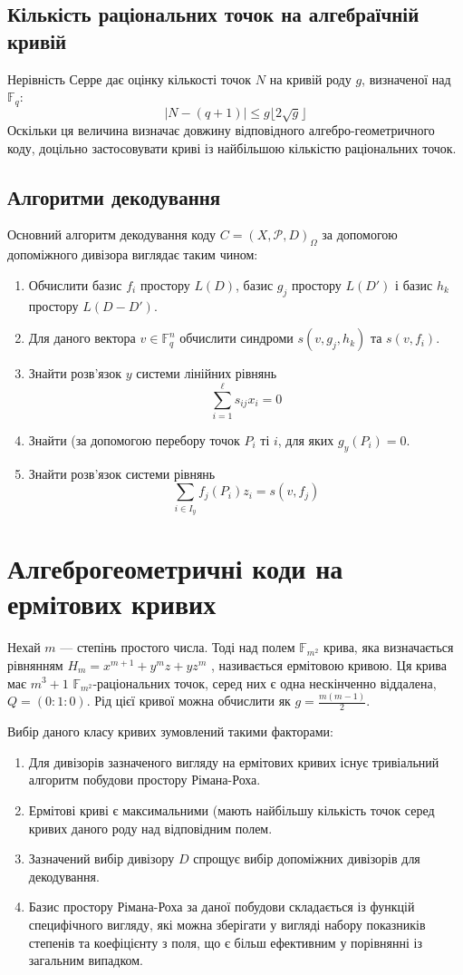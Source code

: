 \documentclass[a4paper,14pt,oneside]{extarticle}
\begin{document}
\subsection{Кількість раціональних точок на алгебраїчній кривій}
Нерівність Серре дає оцінку кількості точок $N$ на кривій роду $g$, визначеної над $\mathbb{F}_q$:
$$|N-(q+1)| \le g \lfloor 2 \sqrt{g} \rfloor$$
Оскільки ця величина визначає довжину відповідного алгебро-геометричного коду, доцільно застосовувати криві із найбільшою кількістю 
раціональних точок.

\subsection{Алгоритми декодування}
Основний алгоритм декодування коду $C = (X, \mathcal{P}, D)_{\Omega}$ за допомогою допоміжного дивізора виглядає таким чином:
\begin{enumerate}
    \item Обчислити базис ${f_i}$ простору $L(D)$, базис ${g_j}$ простору $L(D')$ і базис ${h_k}$ простору $L(D-D')$.
    \item Для даного вектора $v \in \mathbb{F}_q^n$ обчислити синдроми $s(v, g_j, h_k)$ та $s(v, f_i)$.
    \item Знайти розв'язок $y$ системи лінійних рівнянь
        $$\sum_{i=1}^\ell s_{ij} x_i = 0$$
    \item Знайти (за допомогою перебору точок $P_i$ ті $i$, для яких $g_y(P_i) = 0$.
    \item Знайти розв'язок системи рівнянь
        $$\sum_{i \in I_y} f_j(P_i)z_i = s(v, f_j)$$
\end{enumerate}

\pagebreak
\section{Алгеброгеометричні коди на ермітових кривих}
Нехай $m$ --- степінь простого числа. Тоді над полем $\mathbb{F}_{m^2}$ крива, яка визначається рівнянням $H_m = x^{m+1} + y^m z + y z^m$ ,
називається ермітовою кривою. Ця крива має $m^3+1$ $\mathbb{F}_{m^2}$-раціональних точок, серед них є одна нескінченно віддалена, 
$Q = (0:1:0)$. Рід цієї кривої можна обчислити як $g = \frac{m(m-1)}{2}$.

Вибір даного класу кривих зумовлений такими факторами:
\begin{enumerate}
    \item Для дивізорів зазначеного вигляду на ермітових кривих існує тривіальний алгоритм побудови простору Рімана-Роха.
    \item Ермітові криві є максимальними (мають найбільшу кількість точок серед кривих даного роду над відповідним полем.
    \item Зазначений вибір дивізору $D$ спрощує вибір допоміжних дивізорів для декодування.
    \item Базис простору Рімана-Роха за даної побудови складається із функцій специфічного вигляду, які можна зберігати у вигляді набору показників степенів та 
        коефіцієнту з поля, що є більш ефективним у порівнянні із загальним випадком.
\end{enumerate}
\end{document}
